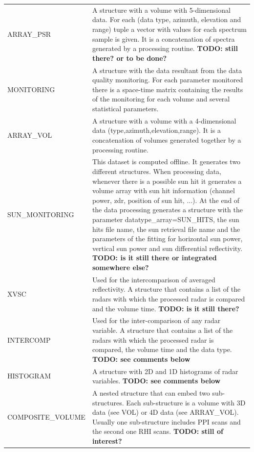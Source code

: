 \documentclass[a4paper,11pt,pdftex,twoside]{scrartcl}
\renewcommand{\bf}{\normalfont \bfseries}
\begin{document}
{{{\begin{longtable}{p{}p{}}
ARRAY\_PSR              & A structure with a volume with 5-dimensional data. For each (data type, azimuth,
                         elevation and range) tuple a vector with values for each spectrum sample is given.
                         It is a concatenation of spectra generated by a processing routine. {\bf TODO: still there? or to be done? }                                    \\
MONITORING             & A structure with the data resultant from the data quality monitoring. For each
                         parameter monitored there is a space-time matrix containing the results of the
                         monitoring for each volume and several statistical parameters.\\
ARRAY\_VOL             & A structure with a volume with a 4-dimensional data (type,azimuth,elevation,range).
                         It is a concatenation of volumes generated together by a processing routine.\\
SUN\_MONITORING        & This dataset is computed offline. It generates two different structures. When
                         processing data, whenever there is a possible sun hit it generates a volume array
                         with sun hit information (channel power, zdr, position of sun hit, ...). At the
                         end of the data processing generates a structure with the parameter
                         datatype\_array=SUN\_HITS, the sun hits file name, the sun retrieval file name
                         and the parameters of the fitting for horizontal sun power, vertical sun power
                         and sun differential reflectivity. {\bf TODO: is it still there or integrated somewhere else?}\\
XVSC                   & Used for the intercomparison of averaged reflectivity. A structure that contains
                         a list of the radars with which the processed radar is compared and the volume
                         time. {\bf TODO: is it still there?}\\
INTERCOMP              & Used for the inter-comparison of any radar variable. A structure that contains
                         a list of the radars with which the processed radar is compared, the volume time
                         and the data type. {\bf TODO: see comments below}\\
HISTOGRAM              & A structure with 2D and 1D histograms of radar variables. {\bf TODO: see comments below}\\
COMPOSITE\_VOLUME      & A nested structure that can embed two sub-structures. Each sub-structure is a volume
                         with 3D data (see VOL) or 4D data (see ARRAY\_VOL). Usually one sub-structure
                         includes PPI scans and the second one RHI scans. {\bf TODO: still of interest?}\\
\end{longtable}

}}}
\end{document}
